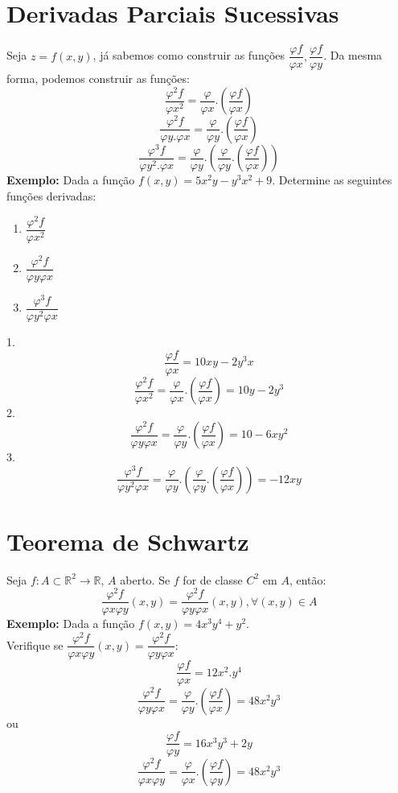 \documentclass{article}
\begin{document}
	\section{Derivadas Parciais Sucessivas}
		Seja $z=f(x,y)$, já sabemos como construir as funções $\dfrac{\varphi f}{\varphi x}, \dfrac{\varphi f}{\varphi y}$. Da mesma forma, podemos construir as funções:
		$$\dfrac{\varphi ^2 f}{\varphi x^2} = \dfrac{\varphi}{\varphi x}.(\dfrac{\varphi f}{\varphi x})$$
		$$\dfrac{\varphi^2f}{\varphi y . \varphi x}= \dfrac{\varphi}{\varphi y}.(\dfrac{\varphi f}{\varphi x})$$
		$$\dfrac{\varphi ^3f}{\varphi y^2.\varphi x} = \dfrac{\varphi}{\varphi y}.(\dfrac{\varphi}{\varphi y}.(\dfrac{\varphi f}{\varphi x}))$$
		\textbf{Exemplo:} Dada a função $f(x,y) = 5x^2y-y^3x^2+9$. Determine as seguintes funções derivadas:
		\begin{enumerate}
			\item $\dfrac{\varphi^2f}{\varphi x^2}$
			\item $\dfrac{\varphi ^2 f}{\varphi y \varphi x}$
			\item $\dfrac{\varphi ^3f}{\varphi y^2\varphi x}$
		\end{enumerate}
		1.
		$$\dfrac{\varphi f}{\varphi x} = 10xy-2y^3x$$
		$$\dfrac{\varphi ^2f}{\varphi x^2} = \dfrac{\varphi}{\varphi x}.(\dfrac{\varphi f}{\varphi x}) = 10y - 2y^3$$
		2.
		$$\dfrac{\varphi ^2f}{\varphi y \varphi x}=\dfrac{\varphi}{\varphi y}.(\dfrac{\varphi f}{\varphi x})=10-6xy^2$$
		3.
		$$\dfrac{\varphi ^3 f}{\varphi y^2 \varphi x}=\dfrac{\varphi}{\varphi y}.(\dfrac{\varphi}{\varphi y}.(\dfrac{\varphi f}{\varphi x})) = -12xy$$
		
		
	\section{Teorema de Schwartz}
		Seja $f:A \subset \mathbb{R}^2\to \mathbb{R}$, $A$ aberto. Se $f$ for de classe $C^2$ em $A$, então:
		$$\dfrac{\varphi ^2 f}{\varphi x \varphi y}(x,y) = \dfrac{\varphi ^2 f}{\varphi y \varphi x}(x,y), \forall (x,y) \in A$$
		\textbf{Exemplo:} Dada a função $f(x,y)= 4x^3y^4+y^2$.\\
		Verifique se $\dfrac{\varphi ^2 f}{\varphi x \varphi y}(x,y) = \dfrac{\varphi ^2 f}{\varphi y \varphi x}$:
		$$\dfrac{\varphi f}{\varphi x} = 12x^2.y^4$$
		$$\dfrac{\varphi ^2 f}{\varphi y \varphi x} =\dfrac{\varphi}{\varphi y} .(\dfrac{\varphi f}{\varphi x}) = 48 x^2y^3$$
		ou
		$$\dfrac{\varphi f}{\varphi y} = 16 x^3y^3+2y$$
		$$\dfrac{\varphi ^2 f}{\varphi x \varphi y} = \dfrac{\varphi}{\varphi x}.(\dfrac{\varphi f}{\varphi y}) = 48x^2y^3$$
\end{document}
